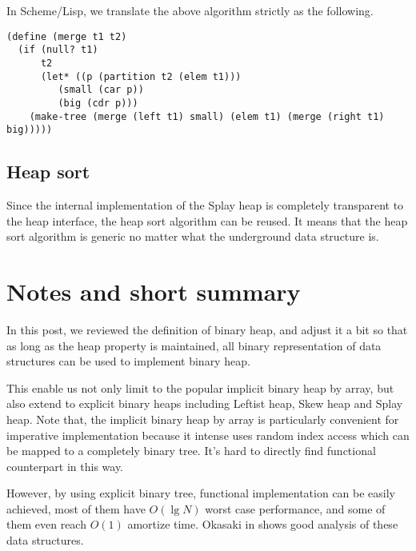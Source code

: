 \documentclass{article}
\begin{document}
In Scheme/Lisp, we translate the above algorithm strictly as the following.

\lstset{language=lisp}
\begin{lstlisting}
(define (merge t1 t2)
  (if (null? t1)
      t2
      (let* ((p (partition t2 (elem t1)))
	     (small (car p))
	     (big (cdr p)))
	(make-tree (merge (left t1) small) (elem t1) (merge (right t1) big)))))
\end{lstlisting}

\subsection{Heap sort}

Since the internal implementation of the Splay heap is completely
transparent to the heap interface, the heap sort algorithm can
be reused. It means that the heap sort algorithm is generic no
matter what the underground data structure is.

\section{Notes and short summary}

In this post, we reviewed the definition of binary heap, and adjust it
a bit so that as long as the heap property is maintained, all binary
representation of data structures can be used to implement binary heap.

This enable us not only limit to the popular implicit binary heap
by array, but also extend to explicit binary heaps including Leftist
heap, Skew heap and Splay heap. Note that, the implicit binary heap
by array is particularly convenient for imperative implementation
because it intense uses random index access which can be mapped to
a completely binary tree. It's hard to directly find functional
counterpart in this way.

However, by using explicit binary tree, functional implementation
can be easily achieved, most of them have $O(\lg N)$ worst case
performance, and some of them even reach $O(1)$ amortize time.
Okasaki in \cite{okasaki-book} shows good analysis of these data
structures.
\end{document}
